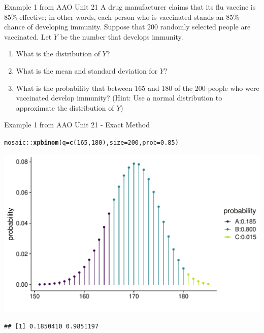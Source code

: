 \documentclass[10pt,handout]{beamer}\usepackage[]{graphicx}\usepackage[]{color}
\makeatletter
\def\maxwidth{ %
  \ifdim\Gin@nat@width>\linewidth
    \linewidth
  \else
    \Gin@nat@width
  \fi
}
\newcommand{\hlnum}[1]{\textcolor[rgb]{0.686,0.059,0.569}{#1}}%
\newcommand{\hlopt}[1]{\textcolor[rgb]{0,0,0}{#1}}%
\newcommand{\hlstd}[1]{\textcolor[rgb]{0.345,0.345,0.345}{#1}}%
\newcommand{\hlkwc}[1]{\textcolor[rgb]{0.333,0.667,0.333}{#1}}%
\newcommand{\hlkwd}[1]{\textcolor[rgb]{0.737,0.353,0.396}{\textbf{#1}}}%
\newenvironment{kframe}{%
 \def\at@end@of@kframe{}%
 \ifinner\ifhmode%
  \def\at@end@of@kframe{\end{minipage}}%
  \begin{minipage}{\columnwidth}%
 \fi\fi%
 \def\FrameCommand##1{\hskip\@totalleftmargin \hskip-\fboxsep
 \colorbox{shadecolor}{##1}\hskip-\fboxsep
     \hskip-\linewidth \hskip-\@totalleftmargin \hskip\columnwidth}%
 \MakeFramed {\advance\hsize-\width
   \@totalleftmargin\z@ \linewidth\hsize
   \@setminipage}}%
 {\par\unskip\endMakeFramed%
 \at@end@of@kframe}
\newenvironment{knitrout}{}{} %
\makeatother
\begin{document}
\begin{frame}{Example 1 from AAO Unit 21}
	A drug manufacturer claims that its flu vaccine is 85\% effective; in other words, each person who is vaccinated stands an 85\% chance of developing immunity. Suppose that 200 randomly selected people are vaccinated. Let $Y$ be the number that develops immunity.
	
	\begin{enumerate}
		\item What is the distribution of $Y$?
		\item What is the mean and standard deviation for $Y$?
		\item What is the probability that between 165 and 180 of the 200 people who were vaccinated
		develop immunity? (Hint: Use a normal distribution to approximate the distribution of $Y$)
	\end{enumerate}
\end{frame}


\begin{frame}[fragile]{Example 1 from AAO Unit 21 - Exact Method}
	
\begin{knitrout}\tiny
{}\color{fgcolor}\begin{kframe}
\begin{alltt}
\hlstd{mosaic}\hlopt{::}\hlkwd{xpbinom}\hlstd{(}\hlkwc{q} \hlstd{=} \hlkwd{c}\hlstd{(}\hlnum{165}\hlstd{,} \hlnum{180}\hlstd{),} \hlkwc{size} \hlstd{=} \hlnum{200}\hlstd{,} \hlkwc{prob} \hlstd{=} \hlnum{0.85}\hlstd{)}
\end{alltt}
\end{kframe}

{\centering \includegraphics[width=\maxwidth]{figure/unnamed-chunk-8-1} 

}


\begin{kframe}\begin{verbatim}
## [1] 0.1850410 0.9851197
\end{verbatim}
\end{kframe}
\end{knitrout}
\end{frame}
\end{document}
